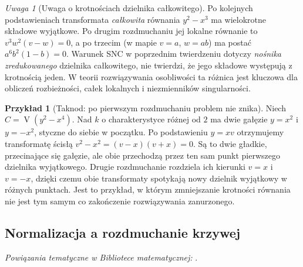\documentclass[11pt,a4paper,openany]{report}
\numberwithin{equation}{section}
\theoremstyle{plain}
\theoremstyle{definition}
\newtheorem{przyklad}[twierdzenie]{Przykład}
\theoremstyle{remark}
\newtheorem{uwaga}[twierdzenie]{Uwaga}
\newcommand{\V}{\operatorname V}
\begin{document}
\begin{uwaga}[Uwaga o krotnościach dzielnika całkowitego]
Po kolejnych podstawieniach transformata \emph{całkowita}
równania $y^2-x^3$ ma wielokrotne składowe wyjątkowe.
Po drugim rozdmuchaniu jej lokalne równanie to
$v^3w^2(v-w)=0$, a po trzecim (w mapie $v=a$,
$w=ab$) ma postać $a^6b^2(1-b)=0$.
Warunek SNC w poprzednim twierdzeniu dotyczy
\emph{nośnika zredukowanego} dzielnika całkowitego,
nie twierdzi, że jego składowe występują z krotnością jeden.
W teorii rozwiązywania osobliwości ta różnica jest
kluczowa dla obliczeń rozbieżności, całek lokalnych
i niezmienników singularności.
\end{uwaga}

\begin{przyklad}[Taknod: po pierwszym rozdmuchaniu problem nie znika]
Niech $C=\V(y^2-x^4)$. Nad $k$ o charakterystyce
różnej od $2$ ma dwie gałęzie $y=x^2$ i $y=-x^2$,
styczne do siebie w początku. Po podstawieniu
$y=xv$ otrzymujemy transformatę ścisłą
$v^2-x^2=(v-x)(v+x)=0$. Są to dwie gładkie,
przecinające się gałęzie, ale obie przechodzą
przez ten sam punkt pierwszego dzielnika wyjątkowego.
Drugie rozdmuchanie rozdziela ich kierunki
$v=x$ i $v=-x$, dzięki czemu obie transformaty
spotykają nowy dzielnik wyjątkowy w różnych punktach.
Jest to przykład, w którym zmniejszanie krotności
równania nie jest tym samym co zakończenie
rozwiązywania zanurzonego.
\end{przyklad}

\subsection{Normalizacja a rozdmuchanie krzywej}

\noindent\emph{Powiązania tematyczne w Bibliotece matematycznej:} .
\end{document}

